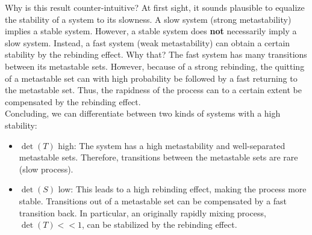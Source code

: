 Why is this result counter-intuitive? At first sight, it sounds plausible to equalize the stability of a system to its slowness.
A slow system (strong metastability) implies a stable system. However, a stable system does \textbf{not} necessarily imply a slow system.
Instead, a fast system (weak metastability) can obtain a certain stability by the rebinding effect. Why that? The fast system has many transitions between its metastable sets. However, because of a strong rebinding, the quitting of a metastable set can with high probability be followed by a fast returning to the metastable set.
Thus, the rapidness of the process can to a certain extent be compensated by the rebinding effect.
\\

Concluding, we can differentiate between two kinds of systems with a high stability:
\begin{itemize}
	\item $\det(T)$ high: The system has a high metastability and well-separated metastable sets. Therefore, transitions between the metastable sets are rare (slow process).
	\item $\det(S)$ low: This leads to a high rebinding effect, making the process more stable. Transitions out of a metastable set can be compensated by a fast transition back. In particular, an originally rapidly mixing process, $\det(T) << 1$, can be stabilized by the rebinding effect.
\end{itemize}


